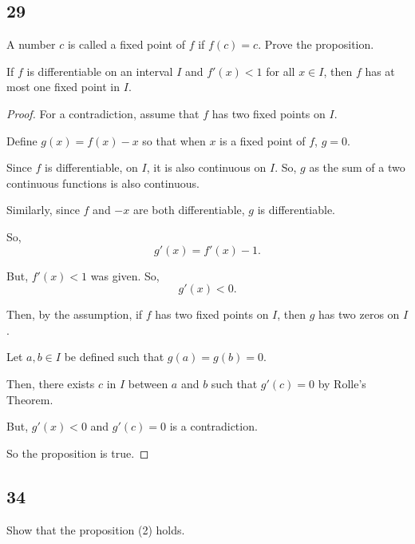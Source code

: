 \documentclass[../hw4.tex]{subfiles}
\begin{document}
\subsection*{29}
A number $c$ is called a fixed point of $f$ if $f(c) = c$. 
Prove the proposition.

\begin{proposition}
    If $f$ is differentiable on an interval $I$ and $f'(x) < 1$ for all $x \in I$, 
    then $f$ has at most one fixed point in $I$. 
\end{proposition}

\begin{proof}
    For a contradiction, assume that $f$ has two fixed points on $I$.

    Define $g(x) = f(x) - x$ so that when $x$ is a fixed point of $f$, $g = 0$.

    Since $f$ is differentiable, on $I$, it is also continuous on $I$. So, $g$ as the sum of a two continuous functions is also continuous.

    Similarly, since $f$ and $-x$ are both differentiable, $g$ is differentiable.

    So, \[g'(x) = f'(x) - 1.\]

    But, $f'(x) < 1$ was given. So, \[g'(x) < 0.\]

    Then, by the assumption, if $f$ has two fixed points on $I$, then $g$ has two zeros on $I$. 

    Let $a,b \in I$ be defined such that $g(a)=g(b)=0$.

    Then, there exists $c$ in $I$ between $a$ and $b$ such that $g'(c) = 0$ by Rolle's Theorem.

    But, $g'(x) < 0$ and $g'(c) = 0$ is a contradiction.

    So the proposition is true.
\end{proof}


\subsection*{34}
Show that the proposition (2) holds.

\end{document}
